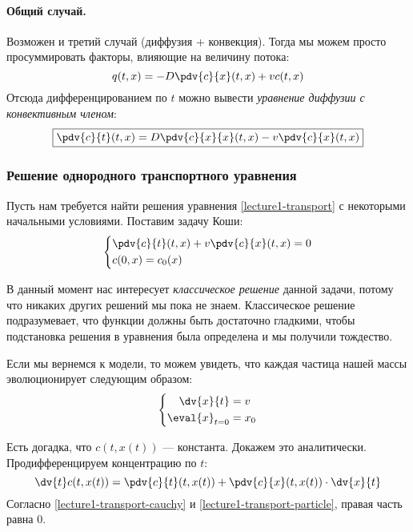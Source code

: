 \paragraph{Общий случай.}

Возможен и третий случай (диффузия + конвекция). Тогда мы можем просто просуммировать факторы, влияющие на величину потока:
%
\begin{equation*}
  q(t, x) = -D \pdv{c}{x} (t, x) + v c(t, x)
\end{equation*}
%
Отсюда дифференцированием по $t$ можно вывести \emph{уравнение диффузии с конвективным членом}:
%
\begin{equation}
  \boxed{%
    \pdv{c}{t}(t, x) = D \pdv{c}{x}{x} (t, x) - v \pdv{c}{x} (t, x)}
  \label{lecture1-diffusion-transport}
\end{equation}

\subsubsection{Решение однородного транспортного уравнения}

Пусть нам требуется найти решения уравнения \eqref{lecture1-transport} с некоторыми начальными условиями. Поставим задачу Коши:
%
\begin{equation}
  \left\{\begin{aligned}
    &\pdv{c}{t} (t, x) + v \pdv{c}{x} (t, x) = 0 \\
    &c(0, x) = c_0(x)
  \end{aligned}\right.
  \label{lecture1-transport-cauchy}
\end{equation}

В данный момент нас интересует \emph{классическое решение} данной задачи, потому что никаких других решений мы пока не знаем. Классическое решение подразумевает, что функции должны быть достаточно гладкими, чтобы подстановка решения в уравнения была определена и мы получили тождество.

Если мы вернемся к модели, то можем увидеть, что каждая частица нашей массы эволюционирует следующим образом:
%
\begin{equation}
  \left\{\begin{aligned}
    \dv{x}{t} &= v \\
    \eval{x}_{t=0} &= x_0
  \end{aligned}\right.
  \label{lecture1-transport-particle}
\end{equation}

Есть догадка, что $c(t, x(t))$ --- константа. Докажем это аналитически. Продифференцируем концентрацию по $t$:
%
\begin{equation*}
  \dv{t} c(t, x(t)) = \pdv{c}{t} (t, x(t)) + \pdv{c}{x} (t, x(t)) \cdot \dv{x}{t}
\end{equation*}
%
Согласно \eqref{lecture1-transport-cauchy} и \eqref{lecture1-transport-particle}, правая часть равна $0$.


